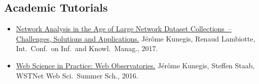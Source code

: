 \documentclass[line,mm]{res}
\newcounter{x}
\newcounter{y}
\newcommand{\talknumber}{T\arabic{y}\stepcounter{y}}
\begin{document}
\begin{resume}
\section{Academic Tutorials}
\begin{itemize}
  \item[{[\talknumber]}]
    \href{http://xn.unamur.be/network-collection-tutorial-cikm2017/}{Network Analysis in the Age of Large Network Dataset Collections~--
    Challenges, Solutions and Applications.}
    Jérôme Kunegis, Renaud Lambiotte, Int.\ Conf.\ on Inf.\ and Knowl.\ Manag., 2017.  
  \item[{[\talknumber]}] 
    \href{http://wwsss16.webscience.org/speakers-and-tutors/dr-jerome-kunegis}{Web Science in Practice:  Web Observatories.}  
    Jérôme Kunegis, Steffen Staab, WSTNet Web Sci.\ Summer Sch., 2016.  
\end{itemize}


\end{resume}
\end{document}
